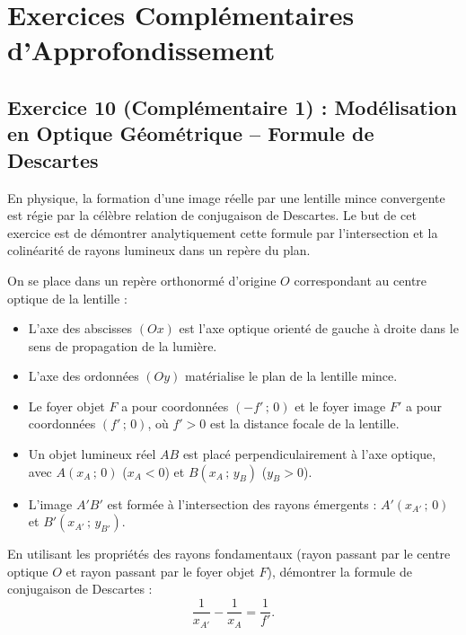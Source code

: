 \documentclass[11pt,a4paper]{article}
\begin{document}
\newpage
\section{Exercices Complémentaires d'Approfondissement}

\subsection*{Exercice 10 (Complémentaire 1) : Modélisation en Optique Géométrique -- Formule de Descartes}

\begin{enoncebox}
En physique, la formation d'une image réelle par une lentille mince convergente est régie par la célèbre relation de conjugaison de Descartes. Le but de cet exercice est de démontrer analytiquement cette formule par l'intersection et la colinéarité de rayons lumineux dans un repère du plan.

On se place dans un repère orthonormé d'origine $O$ correspondant au centre optique de la lentille :
\begin{itemize}
    \item L'axe des abscisses $(Ox)$ est l'axe optique orienté de gauche à droite dans le sens de propagation de la lumière.
    \item L'axe des ordonnées $(Oy)$ matérialise le plan de la lentille mince.
    \item Le foyer objet $F$ a pour coordonnées $(-f'\,;\,0)$ et le foyer image $F'$ a pour coordonnées $(f'\,;\,0)$, où $f' > 0$ est la distance focale de la lentille.
    \item Un objet lumineux réel $AB$ est placé perpendiculairement à l'axe optique, avec $A(x_A\,;\,0)$ ($x_A < 0$) et $B(x_A\,;\,y_B)$ ($y_B > 0$).
    \item L'image $A'B'$ est formée à l'intersection des rayons émergents : $A'(x_{A'}\,;\,0)$ et $B'(x_{A'}\,;\,y_{B'})$.
\end{itemize}
En utilisant les propriétés des rayons fondamentaux (rayon passant par le centre optique $O$ et rayon passant par le foyer objet $F$), démontrer la formule de conjugaison de Descartes :
\[
\frac{1}{x_{A'}} - \frac{1}{x_A} = \frac{1}{f'}.
\]
\end{enoncebox}
\end{document}
